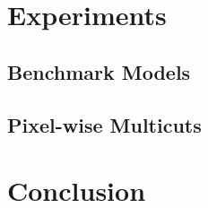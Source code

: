 \documentclass[10pt,twocolumn,letterpaper]{article}
\begin{document}
\section{Experiments}
\subsection{Benchmark Models}












\begin{figure*}

\end{figure*}












\subsection{Pixel-wise Multicuts}



\section{Conclusion}

    



{\small


}
\end{document}
